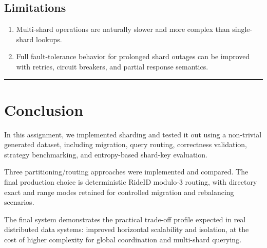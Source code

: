 \documentclass[12pt]{article}
\begin{document}
\subsection{Limitations}

\begin{enumerate}
    \item Multi-shard operations are naturally slower and more complex than single-shard lookups.
    \item Full fault-tolerance behavior for prolonged shard outages can be improved with retries, circuit breakers, and partial response semantics.
\end{enumerate}

\hrule
\vspace{0.75em}

\section{Conclusion}

In this assignment, we implemented sharding and tested it out using a non-trivial generated dataset, including migration, query routing, correctness validation, strategy benchmarking, and entropy-based shard-key evaluation.

Three partitioning/routing approaches were implemented and compared. The final production choice is deterministic RideID modulo-3 routing, with directory exact and range modes retained for controlled migration and rebalancing scenarios.

The final system demonstrates the practical trade-off profile expected in real distributed data systems: improved horizontal scalability and isolation, at the cost of higher complexity for global coordination and multi-shard querying.
\end{document}
